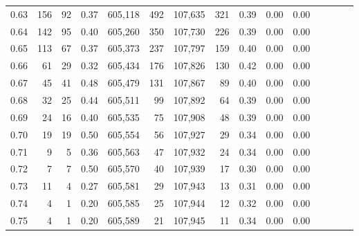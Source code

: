 \begin{tabular}{rrrcrrrrrrrrrrr}
0.63 &     156 &     92 &                                       0.37 &  605,118 &      492 &  107,635 &      321 &  0.39 &  0.00 &                         0.00 \\
0.64 &     142 &     95 &                                       0.40 &  605,260 &      350 &  107,730 &      226 &  0.39 &  0.00 &                         0.00 \\
0.65 &     113 &     67 &                                       0.37 &  605,373 &      237 &  107,797 &      159 &  0.40 &  0.00 &                         0.00 \\
0.66 &      61 &     29 &                                       0.32 &  605,434 &      176 &  107,826 &      130 &  0.42 &  0.00 &                         0.00 \\
0.67 &      45 &     41 &                                       0.48 &  605,479 &      131 &  107,867 &       89 &  0.40 &  0.00 &                         0.00 \\
0.68 &      32 &     25 &                                       0.44 &  605,511 &       99 &  107,892 &       64 &  0.39 &  0.00 &                         0.00 \\
0.69 &      24 &     16 &                                       0.40 &  605,535 &       75 &  107,908 &       48 &  0.39 &  0.00 &                         0.00 \\
0.70 &      19 &     19 &                                       0.50 &  605,554 &       56 &  107,927 &       29 &  0.34 &  0.00 &                         0.00 \\
0.71 &       9 &      5 &                                       0.36 &  605,563 &       47 &  107,932 &       24 &  0.34 &  0.00 &                         0.00 \\
0.72 &       7 &      7 &                                       0.50 &  605,570 &       40 &  107,939 &       17 &  0.30 &  0.00 &                         0.00 \\
0.73 &      11 &      4 &                                       0.27 &  605,581 &       29 &  107,943 &       13 &  0.31 &  0.00 &                         0.00 \\
0.74 &       4 &      1 &                                       0.20 &  605,585 &       25 &  107,944 &       12 &  0.32 &  0.00 &                         0.00 \\
0.75 &       4 &      1 &                                       0.20 &  605,589 &       21 &  107,945 &       11 &  0.34 &  0.00 &                         0.00 \\

\end{tabular}
